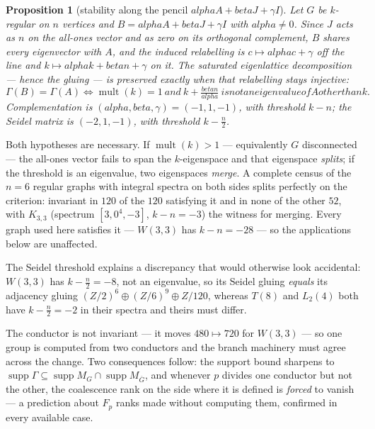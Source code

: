 \documentclass[12pt,a4paper]{article}
\def\mathbb#1{#1}%
\def\text#1{#1}%
\def\alpha{alpha}%
\def\beta{beta}%
\newtheorem{proposition}[theorem]{Proposition}
\theoremstyle{definition}
\newcommand{\ZZ}{\mathbb{Z}}
\begin{document}
\begin{proposition}[stability along the pencil $\alpha A+\beta J+\gamma I$]
\label{prop:complementation}
Let $G$ be $k$-regular on $n$ vertices and $B = \alpha A + \beta J + \gamma I$
with $\alpha\neq 0$. Since $J$ acts as $n$ on the all-ones vector and as zero on
its orthogonal complement, $B$ shares every eigenvector with $A$, and the induced
relabelling is $c\mapsto \alpha c+\gamma$ off the line and
$k\mapsto \alpha k+\beta n+\gamma$ on it. The saturated eigenlattice
decomposition --- hence the gluing --- is preserved exactly when that relabelling
stays injective:
\[
  \Gamma(B)=\Gamma(A)
  \iff
  \operatorname{mult}(k)=1
  \ \text{ and }\
  k+\tfrac{\beta n}{\alpha}\ \text{is not an eigenvalue of }A\text{ other than }k.
\]
Complementation is $(\alpha,\beta,\gamma)=(-1,1,-1)$, with threshold $k-n$;
the Seidel matrix is $(-2,1,-1)$, with threshold $k-\tfrac n2$.
\end{proposition}

Both hypotheses are necessary. If $\operatorname{mult}(k)>1$ --- equivalently
$G$ disconnected --- the all-ones vector fails to span the $k$-eigenspace and
that eigenspace \emph{splits}; if the threshold is an eigenvalue, two eigenspaces
\emph{merge}. A complete census of the $n=6$ regular graphs with integral spectra
on both sides splits perfectly on the criterion: invariant in $120$ of the $120$
satisfying it and in none of the other $52$, with $K_{3,3}$ (spectrum
$[3,0^4,-3]$, $k-n=-3$) the witness for merging. Every graph used here satisfies
it --- $W(3,3)$ has $k-n=-28$ --- so the applications below are unaffected.

The Seidel threshold explains a discrepancy that would otherwise look accidental:
$W(3,3)$ has $k-\tfrac n2 = -8$, not an eigenvalue, so its Seidel gluing
\emph{equals} its adjacency gluing $(\ZZ/2)^6\oplus(\ZZ/6)^9\oplus\ZZ/120$,
whereas $T(8)$ and $L_2(4)$ both have $k-\tfrac n2=-2$ in their spectra and
theirs must differ.

The conductor is not invariant --- it moves $480\mapsto 720$ for $W(3,3)$ ---
so one group is computed from two conductors and the branch machinery must agree
across the change. Two consequences follow: the support bound sharpens to
$\operatorname{supp}\Gamma \subseteq \operatorname{supp}M_G \cap
\operatorname{supp}M_{\overline G}$, and whenever $p$ divides one conductor but
not the other, the coalescence rank on the side where it is defined is
\emph{forced} to vanish --- a prediction about $\mathbb F_p$ ranks made without
computing them, confirmed in every available case.
\end{document}
